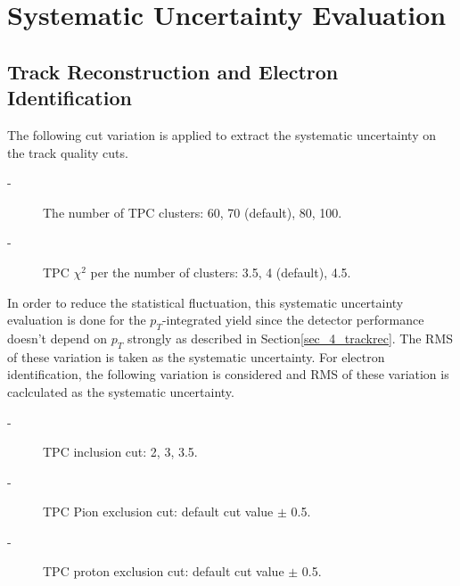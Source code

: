 



\section{Systematic Uncertainty Evaluation}
\label{sec_4_syst}
\subsection{Track Reconstruction and Electron Identification}
The following cut variation is applied to extract the systematic uncertainty on the track quality cuts. 
\begin{description}
  \item[-] The number of TPC clusters: 60, 70 (default),  80, 100.
  \item[-] TPC $\chi^{2}$ per the number of clusters: 3.5, 4 (default), 4.5.
\end{description}
In order to reduce the statistical fluctuation, this systematic uncertainty evaluation is done for the $p_{T}$-integrated yield since the detector performance doesn't depend on $p_{T}$ strongly as described in Section\ref{sec_4_trackrec}. 
The RMS of these variation is taken as the systematic uncertainty. 
For electron identification, the following variation is considered and RMS of these variation is caclculated as the systematic uncertainty.
\begin{description}
  \item[-] TPC inclusion cut: 2, 3, 3.5. 
  \item[-] TPC Pion exclusion cut: default cut value $\pm$ 0.5. 
  \item[-] TPC proton exclusion cut: default cut value $\pm$ 0.5.
\end{description}

